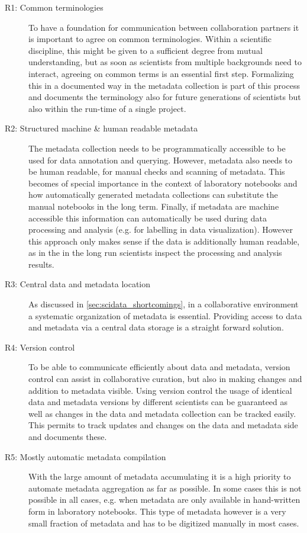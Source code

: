 \begin{description}
 \item[R1: Common terminologies] To have a foundation for communication between collaboration partners it is important to agree on common terminologies. Within a scientific discipline, this might be given to a sufficient degree from mutual understanding, but as soon as scientists from multiple backgrounds need to interact, agreeing on common terms is an essential first step. Formalizing this in a documented way in the metadata collection is part of this process and documents the terminology also for future generations of scientists but also within the run-time of a single project.
 \item[R2: Structured machine \& human readable metadata] The metadata collection needs to be programmatically accessible to be used for data annotation and querying. However, metadata also needs to be human readable, for manual checks and scanning of metadata. This becomes of special importance in the context of laboratory notebooks and how automatically generated metadata collections can substitute the manual notebooks in the long term. Finally, if metadata are machine accessible this information can automatically be used during data processing and analysis (e.g. for labelling in data visualization). However this approach only makes sense if the data is additionally human readable, as in the in the long run scientists inspect the processing and analysis results.
 \item[R3: Central data and metadata location] As discussed in \cref{sec:scidata_shortcomings}, in a collaborative environment a systematic organization of metadata is essential. Providing access to data and metadata via a central data storage is a straight forward solution. 
 \item[R4: Version control] To be able to communicate efficiently about data and metadata, version control can assist in collaborative curation, but also in making changes and addition to metadata visible. Using version control the usage of identical data and metadata versions by different scientists can be guaranteed as well as changes in the data and metadata collection can be tracked easily. This permits to track updates and changes on the data and metadata side and documents these.
 \item[R5: Mostly automatic metadata compilation] With the large amount of metadata accumulating it is a high priority to automate metadata aggregation as far as possible. In some cases this is not possible in all cases, e.g. when metadata are only available in hand-written form in laboratory notebooks. This type of metadata however is a very small fraction of metadata and has to be digitized manually in most cases.

\end{description}
